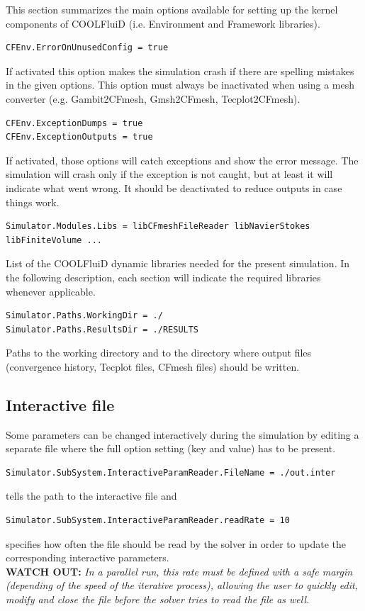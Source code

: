 \documentclass[11pt]{article}
\begin{document}
This section summarizes the main options available for setting up the kernel components of COOLFluiD (i.e. Environment and Framework libraries).

\begin{lstlisting}[breaklines]
CFEnv.ErrorOnUnusedConfig = true
\end{lstlisting}
If activated this option makes the simulation crash if there are spelling mistakes in the given options. This option must always be inactivated when using a mesh converter (e.g. Gambit2CFmesh, Gmsh2CFmesh, Tecplot2CFmesh).

\begin{lstlisting}[breaklines]
CFEnv.ExceptionDumps = true
CFEnv.ExceptionOutputs = true
\end{lstlisting}
If activated, those options will catch exceptions and show the error message. The simulation will crash only if the exception is not caught, but at least it will indicate what went wrong. It should be deactivated to reduce outputs in case things work.

\begin{lstlisting}[breaklines]
Simulator.Modules.Libs = libCFmeshFileReader libNavierStokes libFiniteVolume ...
\end{lstlisting}
List of the COOLFluiD dynamic libraries needed for the present simulation. In the following description, each section will indicate the required libraries whenever applicable.

\begin{lstlisting}[breaklines]
Simulator.Paths.WorkingDir = ./
Simulator.Paths.ResultsDir = ./RESULTS
\end{lstlisting}
Paths to the working directory and to the directory where output files (convergence history, Tecplot files, CFmesh files) should be written. 

\subsection{Interactive file}

Some parameters can be changed interactively during the simulation by editing a separate file
where the full option setting (key and value) has to be present.

\begin{lstlisting}[breaklines]
Simulator.SubSystem.InteractiveParamReader.FileName = ./out.inter
\end{lstlisting}
tells the path to the interactive file and
\begin{lstlisting}[breaklines]
Simulator.SubSystem.InteractiveParamReader.readRate = 10
\end{lstlisting}
specifies how often the file should be read by the solver in order to update the corresponding interactive parameters.\\
{\bf WATCH OUT:}  {\it In a parallel run, this rate must be defined with a safe margin (depending of the speed of the iterative process), 
  allowing the user to quickly edit, modify and close the file before the solver tries to read the file as well.}
\end{document}
